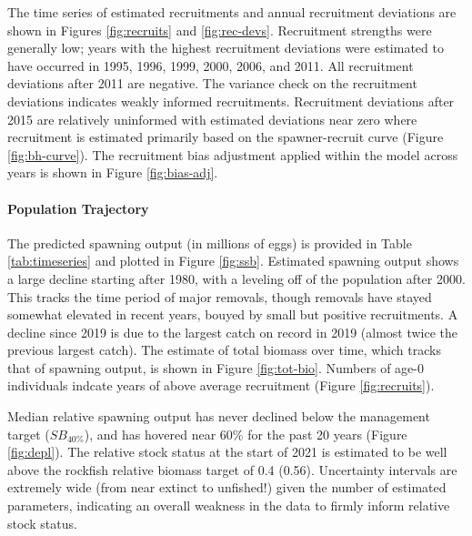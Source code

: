 \documentclass[11pt,
  english,
  a4paper,
]{article}
\begin{document}
The time series of estimated recruitments and annual recruitment deviations are shown in Figures \ref{fig:recruits} and \ref{fig:rec-devs}. Recruitment strengths were generally low; years with the highest recruitment deviations were estimated to have occurred in 1995, 1996, 1999, 2000, 2006, and 2011. All recruitment deviations after 2011 are negative. The variance check on the recruitment deviations indicates weakly informed recruitments. Recruitment deviations after 2015 are relatively uninformed with estimated deviations near zero where recruitment is estimated primarily based on the spawner-recruit curve (Figure \ref{fig:bh-curve}). The recruitment bias adjustment applied within the model across years is shown in Figure \ref{fig:bias-adj}.

\leavevmode\tagmcend\tagstructend\par


\hypertarget{population-trajectory}{%
\paragraph{Population Trajectory}\label{population-trajectory}}

\leavevmode\tagmcend\tagstructend


The predicted spawning output (in millions of eggs) is provided in Table \ref{tab:timeseries} and plotted in Figure \ref{fig:ssb}. Estimated spawning output shows a large decline starting after 1980, with a leveling off of the population after 2000. This tracks the time period of major removals, though removals have stayed somewhat elevated in recent years, bouyed by small but positive recruitments. A decline since 2019 is due to the largest catch on record in 2019 (almost twice the previous largest catch). The estimate of total biomass over time, which tracks that of spawning output, is shown in Figure \ref{fig:tot-bio}. Numbers of age-0 individuals indcate years of above average recruitment (Figure \ref{fig:recruits}).

\leavevmode\tagmcend\tagstructend\par


Median relative spawning output has never declined below the management target ({\(SB_{40\%}\)\leavevmode\tagmcend\tagstructend}), and has hovered near 60\% for the past 20 years (Figure \ref{fig:depl}). The relative stock status at the start of 2021 is estimated to be well above the rockfish relative biomass target of 0.4 (0.56). Uncertainty intervals are extremely wide (from near extinct to unfished!) given the number of estimated parameters, indicating an overall weakness in the data to firmly inform relative stock status.
\end{document}

